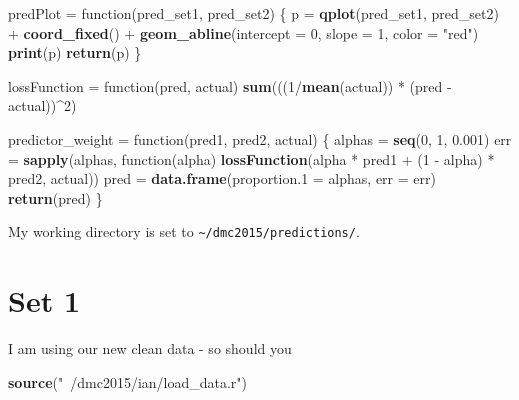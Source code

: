 \documentclass[10pt]{report}
\newenvironment{Shaded}{}{}
\newcommand{\KeywordTok}[1]{\textcolor[rgb]{0.00,0.44,0.13}{\textbf{{#1}}}}
\newcommand{\DataTypeTok}[1]{\textcolor[rgb]{0.56,0.13,0.00}{{#1}}}
\newcommand{\DecValTok}[1]{\textcolor[rgb]{0.25,0.63,0.44}{{#1}}}
\newcommand{\FloatTok}[1]{\textcolor[rgb]{0.25,0.63,0.44}{{#1}}}
\newcommand{\StringTok}[1]{\textcolor[rgb]{0.25,0.44,0.63}{{#1}}}
\newcommand{\NormalTok}[1]{{#1}}
\begin{document}
\begin{Shaded}
\begin{Highlighting}[]
\NormalTok{predPlot =}\StringTok{ }\NormalTok{function(pred_set1, pred_set2) \{}
    \NormalTok{p =}\StringTok{ }\KeywordTok{qplot}\NormalTok{(pred_set1, pred_set2) +}\StringTok{ }\KeywordTok{coord_fixed}\NormalTok{() +}\StringTok{ }\KeywordTok{geom_abline}\NormalTok{(}\DataTypeTok{intercept =} \DecValTok{0}\NormalTok{, }
        \DataTypeTok{slope =} \DecValTok{1}\NormalTok{, }\DataTypeTok{color =} \StringTok{"red"}\NormalTok{)}
    \KeywordTok{print}\NormalTok{(p)}
    \KeywordTok{return}\NormalTok{(p)}
\NormalTok{\}}

\NormalTok{lossFunction =}\StringTok{ }\NormalTok{function(pred, actual) }\KeywordTok{sum}\NormalTok{(((}\DecValTok{1}\NormalTok{/}\KeywordTok{mean}\NormalTok{(actual)) *}\StringTok{ }\NormalTok{(pred -}\StringTok{ }\NormalTok{actual))^}\DecValTok{2}\NormalTok{)}

\NormalTok{predictor_weight =}\StringTok{ }\NormalTok{function(pred1, pred2, actual) \{}
    \NormalTok{alphas =}\StringTok{ }\KeywordTok{seq}\NormalTok{(}\DecValTok{0}\NormalTok{, }\DecValTok{1}\NormalTok{, }\FloatTok{0.001}\NormalTok{)}
    \NormalTok{err =}\StringTok{ }\KeywordTok{sapply}\NormalTok{(alphas, function(alpha) }\KeywordTok{lossFunction}\NormalTok{(alpha *}\StringTok{ }\NormalTok{pred1 +}\StringTok{ }\NormalTok{(}\DecValTok{1} \NormalTok{-}\StringTok{ }\NormalTok{alpha) *}\StringTok{ }
\StringTok{        }\NormalTok{pred2, actual))}
    \NormalTok{pred =}\StringTok{ }\KeywordTok{data.frame}\NormalTok{(}\DataTypeTok{proportion.1 =} \NormalTok{alphas, }\DataTypeTok{err =} \NormalTok{err)}
    \KeywordTok{return}\NormalTok{(pred)}
\NormalTok{\}}
\end{Highlighting}
\end{Shaded}

My working directory is set to \verb!~/dmc2015/predictions/!.

\section{Set 1}\label{set-1}

I am using our new clean data - so should you

\begin{Shaded}
\begin{Highlighting}[]
\KeywordTok{source}\NormalTok{(}\StringTok{"~/dmc2015/ian/load_data.r"}\NormalTok{)}
\end{Highlighting}
\end{Shaded}
\end{document}
